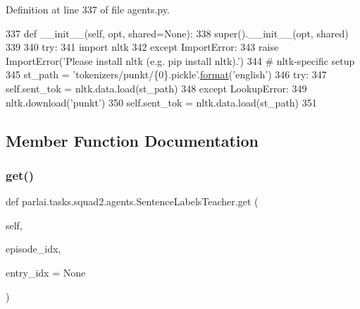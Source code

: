 Definition at line 337 of file agents.\+py.


\begin{DoxyCode}
337     \textcolor{keyword}{def }\_\_init\_\_(self, opt, shared=None):
338         super().\_\_init\_\_(opt, shared)
339 
340         \textcolor{keywordflow}{try}:
341             \textcolor{keyword}{import} nltk
342         \textcolor{keywordflow}{except} ImportError:
343             \textcolor{keywordflow}{raise} ImportError(\textcolor{stringliteral}{'Please install nltk (e.g. pip install nltk).'})
344         \textcolor{comment}{# nltk-specific setup}
345         st\_path = \textcolor{stringliteral}{'tokenizers/punkt/\{0\}.pickle'}.\hyperlink{namespaceparlai_1_1chat__service_1_1services_1_1messenger_1_1shared__utils_a32e2e2022b824fbaf80c747160b52a76}{format}(\textcolor{stringliteral}{'english'})
346         \textcolor{keywordflow}{try}:
347             self.sent\_tok = nltk.data.load(st\_path)
348         \textcolor{keywordflow}{except} LookupError:
349             nltk.download(\textcolor{stringliteral}{'punkt'})
350             self.sent\_tok = nltk.data.load(st\_path)
351 
\end{DoxyCode}


\subsection{Member Function Documentation}
\mbox{\label{classparlai_1_1tasks_1_1squad2_1_1agents_1_1SentenceLabelsTeacher_a1af54cd1c62193018fa1961bb985908e}} 
\subsubsection{\texorpdfstring{get()}{get()}}
{\footnotesize\ttfamily def parlai.\+tasks.\+squad2.\+agents.\+Sentence\+Labels\+Teacher.\+get (\begin{DoxyParamCaption}\item[{}]{self,  }\item[{}]{episode\+\_\+idx,  }\item[{}]{entry\+\_\+idx = {\ttfamily None} }\end{DoxyParamCaption})}



